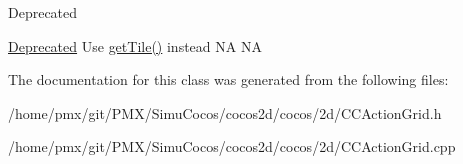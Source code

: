 \begin{DoxyRefDesc}{Deprecated}
\item[\hyperlink{deprecated__deprecated000239}{Deprecated}]Use \hyperlink{classTiledGrid3DAction_a302f322743e028d4b4002af22490e117}{get\+Tile()} instead  NA  NA \end{DoxyRefDesc}


The documentation for this class was generated from the following files\+:\begin{DoxyCompactItemize}
\item 
/home/pmx/git/\+P\+M\+X/\+Simu\+Cocos/cocos2d/cocos/2d/C\+C\+Action\+Grid.\+h\item 
/home/pmx/git/\+P\+M\+X/\+Simu\+Cocos/cocos2d/cocos/2d/C\+C\+Action\+Grid.\+cpp\end{DoxyCompactItemize}
